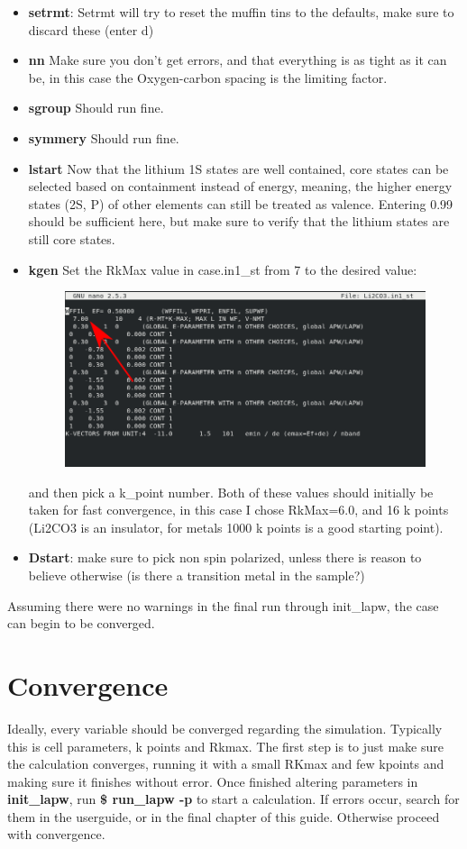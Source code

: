 \documentclass[12pt]{article}
\begin{document}
\begin{itemize}
	\item \textbf{setrmt}: Setrmt will try to reset the muffin tins to the defaults, make sure to discard these (enter d)
	\item \textbf{nn} Make sure you don't get errors, and that everything is as tight as it can be, in this case the Oxygen-carbon spacing is the limiting factor.  
	\item \textbf{sgroup} Should run fine.
	\item  \textbf{symmery} Should run fine. 
	\item \textbf{lstart} Now that the lithium 1S states are well contained, core states can be selected based on containment instead of energy, meaning, the higher energy states (2S, P) of other elements can still be treated as valence.  Entering 0.99 should be sufficient here, but make sure to verify that the lithium states are still core states.
	\item \textbf{kgen} Set the RkMax value in case.in1\_st from 7 to the desired value:		
	\begin{figure}[H]
		\includegraphics[scale=0.4]{./images/init_lapw3.png}
	\end{figure}
	and then pick a k\_point number.  Both of these values should initially be taken for fast convergence, in this case I chose RkMax=6.0, and 16 k points (Li2CO3 is an insulator, for metals 1000 k points is a good starting point).
	\item \textbf{Dstart}: make sure to pick non spin polarized, unless there is reason to believe otherwise (is there a transition metal in the sample?)
\end{itemize}

Assuming there were no warnings in the final run through init\_lapw, the case can begin to be converged.

\section{Convergence}
Ideally, every variable should be converged regarding the simulation.  Typically this is cell parameters, k points and Rkmax.  The first step is to just make sure the calculation converges, running it with a small RKmax and few kpoints and making sure it finishes without error.  Once finished altering parameters in \textbf{init\_lapw}, run \textbf{\$ run\_lapw -p} to start a calculation.  If errors occur, search for them in  the userguide, or in the final chapter of this guide.  Otherwise proceed with convergence.  
\end{document}
